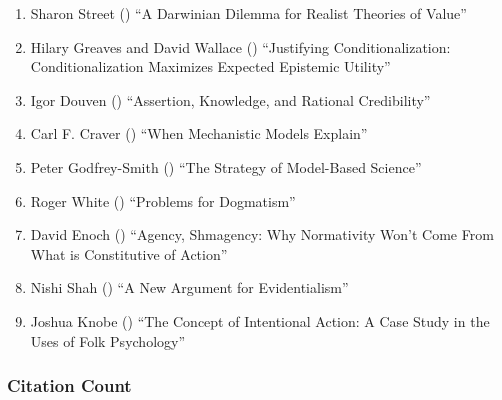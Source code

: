 \documentclass[
  10pt,
  letterpaper,
  DIV=11,
  numbers=noendperiod,
  twoside]{scrartcl}
\providecommand{\tightlist}{%
  \setlength{\itemsep}{0pt}\setlength{\parskip}{0pt}}\usepackage{longtable,booktabs,array}
\begin{document}
\begin{enumerate}
\def\labelenumi{\arabic{enumi}.}
\tightlist
\item
  Sharon Street () ``A Darwinian
  Dilemma for Realist Theories of Value''
\item
  Hilary Greaves and David Wallace
  () ``Justifying
  Conditionalization: Conditionalization Maximizes Expected Epistemic
  Utility''
\item
  Igor Douven () ``Assertion,
  Knowledge, and Rational Credibility''
\item
  Carl F. Craver () ``When
  Mechanistic Models Explain''
\item
  Peter Godfrey-Smith () ``The
  Strategy of Model-Based Science''
\item
  Roger White () ``Problems for
  Dogmatism''
\item
  David Enoch () ``Agency,
  Shmagency: Why Normativity Won't Come From What is Constitutive of
  Action''
\item
  Nishi Shah () ``A New Argument
  for Evidentialism''
\item
  Joshua Knobe () ``The Concept
  of Intentional Action: A Case Study in the Uses of Folk Psychology''
\end{enumerate}

\subsubsection*{Citation Count}\label{sec-count-2006}
\end{document}
